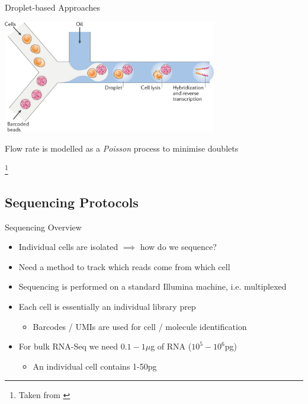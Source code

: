 \documentclass[aspectratio=169,11pt]{beamer}
\newcommand\blfootnote[1]{%
  \begingroup
  \renewcommand\thefootnote{}\footnote{#1}%
  \addtocounter{footnote}{-1}%
  \endgroup
}
\begin{document}
\begin{frame}{Droplet-based Approaches}

	\begin{center}
		\includegraphics[width=0.7\textwidth]{figures/Droplet.jpg}
	\end{center}
	
	\pause
	Flow rate is modelled as a \textit{Poisson} process to minimise doublets
	
	\blfootnote{Taken from \cite{pmid29789704}}

\end{frame}

\subsection{Sequencing Protocols}

\begin{frame}{Sequencing Overview}

	\begin{itemize}
		\item Individual cells are isolated $\implies$ how do we sequence?
		\item Need a method to track which reads come from which cell
		\item Sequencing is performed on a standard Illumina machine, i.e. multiplexed
		\item Each cell is essentially an individual library prep
		\begin{itemize}
			\item Barcodes / UMIs are used for cell / molecule identification
		\end{itemize}
		\item For bulk RNA-Seq we need $0.1-1\mu$g of RNA ($10^5-10^6$pg)
		\begin{itemize}
			\item An individual cell contains 1-50pg
		\end{itemize}
	\end{itemize}

\end{frame}
\end{document}
